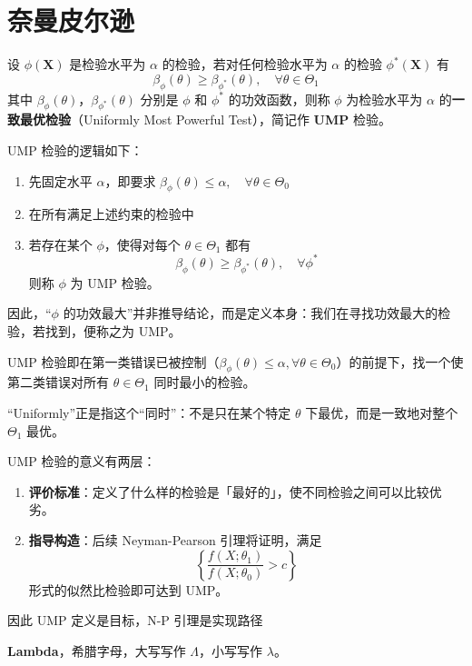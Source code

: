 \section{奈曼皮尔逊}
\begin{definition}[一致最优检验]
设 $\phi(\boldsymbol{X})$ 是检验水平为 $\alpha$ 的检验，若对任何检验水平为 $\alpha$ 的检验 $\phi^*(\boldsymbol{X})$ 有
$$\beta_\phi(\theta) \geq \beta_{\phi^*}(\theta), \quad \forall \theta \in \Theta_1$$
其中 $\beta_\phi(\theta)$，$\beta_{\phi^*}(\theta)$ 分别是 $\phi$ 和 $\phi^*$ 的功效函数，则称 $\phi$ 为检验水平为 $\alpha$ 的\textbf{一致最优检验}（Uniformly Most Powerful Test），简记作 \textbf{UMP} 检验。
\end{definition}
\begin{note}
UMP 检验的逻辑如下：
\begin{enumerate}
    \item 先固定水平 $\alpha$，即要求 $\beta_\phi(\theta) \leq \alpha, \quad \forall \theta \in \Theta_0$
    \item 在所有满足上述约束的检验中
    \item 若存在某个 $\phi$，使得对每个 $\theta \in \Theta_1$ 都有
    $$\beta_\phi(\theta) \geq \beta_{\phi^*}(\theta), \quad \forall \phi^*$$
    则称 $\phi$ 为 UMP 检验。
\end{enumerate}
因此，``$\phi$ 的功效最大''并非推导结论，而是定义本身：我们在寻找功效最大的检验，若找到，便称之为 UMP。
\end{note}
\begin{note}
UMP 检验即在第一类错误已被控制（$\beta_\phi(\theta) \leq \alpha, \forall \theta \in \Theta_0$）的前提下，找一个使第二类错误对所有 $\theta \in \Theta_1$ 同时最小的检验。

``Uniformly''正是指这个``同时''：不是只在某个特定 $\theta$ 下最优，而是一致地对整个 $\Theta_1$ 最优。
\end{note}
\begin{dxtips}
    UMP 检验的意义有两层：
\begin{enumerate}
    \item \textbf{评价标准}：定义了什么样的检验是「最好的」，使不同检验之间可以比较优劣。
    \item \textbf{指导构造}：后续 Neyman-Pearson 引理将证明，满足
    $$\left\{ \frac{f(X;\theta_1)}{f(X;\theta_0)} > c \right\}$$
    形式的似然比检验即可达到 UMP。
\end{enumerate}
因此 UMP 定义是目标，N-P 引理是实现路径
\end{dxtips}
\begin{note}
    \textbf{Lambda}，希腊字母，大写写作 $\Lambda$，小写写作 $\lambda$。
\end{note}
